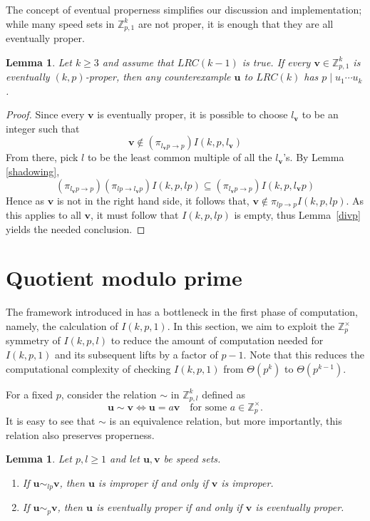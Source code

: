 \documentclass[11pt]{amsart}
\newcommand{\Int}[1]{\mathbb Z_{#1}}
\newcommand{\Unit}[1]{\Int{#1}^\times}
\newcommand{\vbf}{\mathbf{v}}
\newcommand{\ubf}{\mathbf{u}}
\newtheorem{lemma}[theorem]{Lemma}
\theoremstyle{definition}
\theoremstyle{remark}
\begin{document}
The concept of eventual properness simplifies our discussion and implementation; while many speed sets in $\Int{p,1}^k$ are not proper,
it is enough that they are all eventually proper.

\begin{lemma} \label{evenpropdivp}
  Let $k \ge 3$ and assume that $LRC(k-1)$ is true. If every $\vbf \in \Int{p,1}^k$ is eventually $(k,p)$-proper,
  then any counterexample $\ubf$ to $LRC(k)$ has $p \mid u_1\cdots u_k$.
\end{lemma}
\begin{proof}
  Since every $\vbf$ is eventually proper, it is possible to choose $l_\vbf$ to be an integer such that 
  \[ \vbf \notin (\pi_{l_\vbf p \to p}) I(k, p, l_\vbf) \]
  From there, pick $l$ to be the least common multiple of all the $l_\vbf$'s.
  By Lemma \ref{shadowing}, 
  \[ (\pi_{l_\vbf p \to p}) (\pi_{lp \to l_\vbf p}) I(k, p, lp) \subseteq (\pi_{l_\vbf p \to p}) I(k, p, l_\vbf p) \]
  Hence as $\vbf$ is not in the right hand side, it follows that, $\vbf \notin \pi_{lp \to p} I(k, p, lp)$.
  As this applies to all $\vbf$, it must follow that $I(k, p, lp)$ is empty, thus Lemma~\ref{divp} yields the needed conclusion. 
\end{proof}

\section{Quotient modulo prime} \label{sec:quotient}
The framework introduced in \cite{Trakulthongchai} has a bottleneck in the first phase of computation, namely,
the calculation of $I(k, p, 1)$. In this section, we aim to exploit the $\Unit{p}$ symmetry of $I(k,p,l)$ to reduce 
the amount of computation needed for $I(k, p, 1)$ and its subsequent lifts by a factor of $p-1$. 
Note that this reduces the computational complexity of checking $I(k,p,1)$ from $\Theta(p^k)$ to $\Theta(p^{k-1})$.

For a fixed $p$, consider the relation $\sim$ in $\Int{p,l}^k$ defined as
\[ \ubf \sim \vbf \iff \ubf = a\vbf \quad \text{for some } a\in\Unit{p}.\] 
It is easy to see that $\sim$ is an equivalence relation, but more importantly, this relation also preserves properness.

\begin{lemma} \label{lem:simpreserve}
Let $p,l\ge1$ and let $\ubf,\vbf$ be speed sets.
\begin{enumerate}
  \item If $\ubf \sim_{lp} \vbf$, then $\ubf$ is improper if and only if $\vbf$ is improper.
  \item If $\ubf \sim_p \vbf$, then $\ubf$ is eventually proper if and only if $\vbf$ is eventually proper.
\end{enumerate}
\end{lemma}
\end{document}
